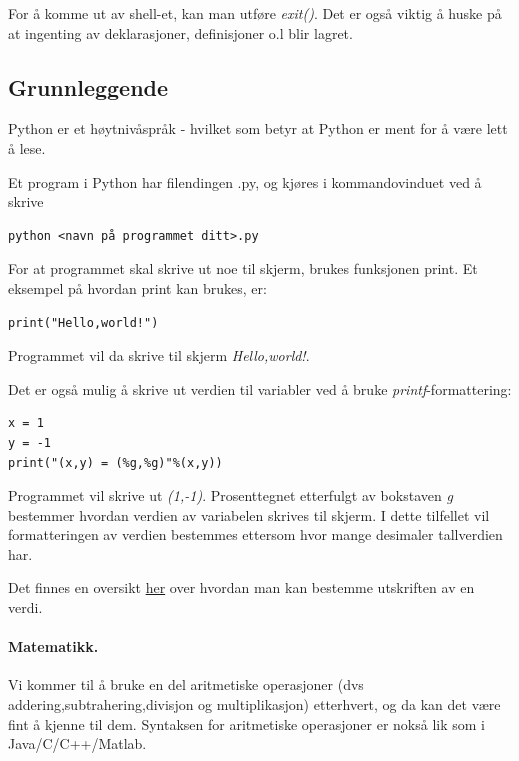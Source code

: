 \documentclass[%
oneside,                 %
final,                   %
10pt,norsk]{article}
\begin{document}
For å komme ut av shell-et, kan man utføre \emph{exit()}. Det er også viktig å huske på at ingenting av deklarasjoner, definisjoner o.l blir lagret.
\subsection{Grunnleggende}
Python er et høytnivåspråk - hvilket som betyr at Python er ment for å være lett å lese.

Et program i Python har filendingen .py, og kjøres i kommandovinduet ved å skrive
\begin{verbatim}
python <navn på programmet ditt>.py
\end{verbatim}

For at programmet skal skrive ut noe til skjerm, brukes funksjonen print.
Et eksempel på hvordan print kan brukes, er:

\begin{verbatim}
print("Hello,world!")
\end{verbatim}

Programmet vil da skrive til skjerm \emph{Hello,world!}.

Det er også mulig å skrive ut verdien til variabler ved å bruke \emph{printf}-formattering:

\begin{verbatim}
x = 1
y = -1
print("(x,y) = (%g,%g)"%(x,y))
\end{verbatim}

Programmet vil skrive ut \emph{(1,-1)}. Prosenttegnet etterfulgt av bokstaven \emph{g} bestemmer hvordan verdien av variabelen skrives til skjerm.
I dette tilfellet vil formatteringen av verdien bestemmes ettersom hvor mange desimaler tallverdien har.

Det finnes en oversikt \href{{https://docs.python.org/2/library/stdtypes.html#string-formatting}}{her} over hvordan man kan bestemme utskriften av en verdi.


\paragraph{Matematikk.}
Vi kommer til å bruke en del aritmetiske operasjoner (dvs addering,subtrahering,divisjon og multiplikasjon) etterhvert, og da kan det være fint å kjenne til dem.
Syntaksen for aritmetiske operasjoner er nokså lik som i Java/C/C++/Matlab.
\end{document}

